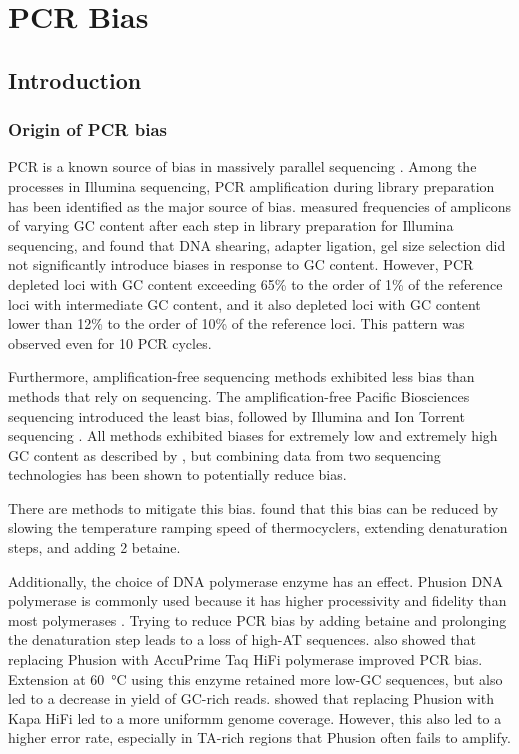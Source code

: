 \documentclass[parskip=full, numbers=noenddot]{scrreprt}
\begin{document}
\chapter{PCR Bias}
\label{ch:pcrbias}

\section{Introduction}
\label{sec:pcrbias_intro}

\subsection{Origin of PCR bias}
\label{ssec:pcrbias_intro_origin}

PCR is a known source of bias in massively parallel sequencing \citep{olova_comparison_2018}.  Among the processes in Illumina sequencing, PCR amplification during library preparation has been identified as the major source of bias.
\citet{aird_analyzing_2011} measured frequencies of amplicons of varying GC content after each step in library preparation for Illumina sequencing, and found that DNA shearing, adapter ligation, gel size selection did not significantly introduce biases in response to GC content.  However, PCR depleted loci with GC content exceeding 65\% to the order of 1\% of the reference loci with intermediate GC content, and it also depleted loci with GC content lower than 12\% to the order of 10\% of the reference loci.  This pattern was observed even for 10 PCR cycles.

Furthermore, amplification-free sequencing methods exhibited less bias than methods that rely on sequencing.  The amplification-free Pacific Biosciences sequencing introduced the least bias, followed by Illumina and Ion Torrent sequencing \citep{ross_characterizing_2013}. All methods exhibited biases for extremely low and extremely high GC content as described by \citet{aird_analyzing_2011}, but combining data from two sequencing technologies has been shown to potentially reduce bias.

There are methods to mitigate this bias.  \citet{aird_analyzing_2011} found that this bias can be reduced by slowing the temperature ramping speed of thermocyclers, extending denaturation steps, and adding \SI{2}{\Molar} betaine.

Additionally, the choice of DNA polymerase enzyme has an effect.  Phusion DNA polymerase is commonly used because it has higher processivity and fidelity than most polymerases \citep{quail_optimal_2012}. Trying to reduce PCR bias by adding betaine and prolonging the denaturation step leads to a loss of high-AT sequences.  \citet{aird_analyzing_2011} also showed that replacing Phusion with AccuPrime Taq HiFi polymerase improved PCR bias.  Extension at \SI{60}{\celsius} using this enzyme retained more low-GC sequences, but also led to a decrease in yield of GC-rich reads.  \citet{quail_optimal_2012} showed that replacing Phusion with Kapa HiFi led to a more uniformm genome coverage.  However, this also led to a higher error rate, especially in TA-rich regions that Phusion often fails to amplify.
\end{document}
